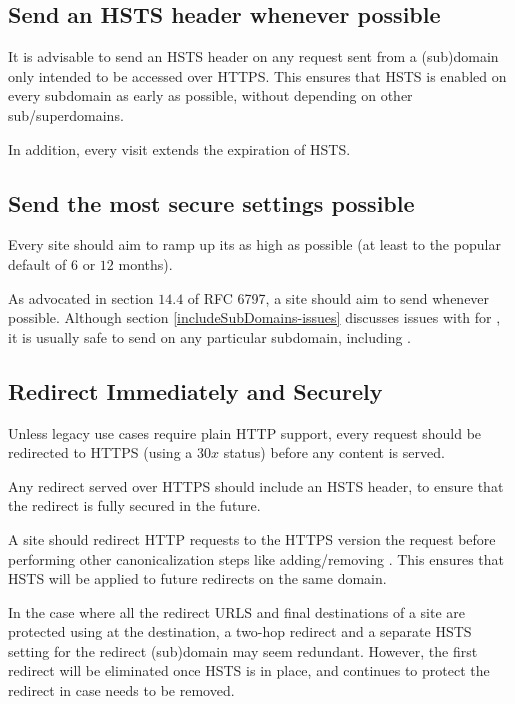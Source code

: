 \documentclass{acm_proc_article-sp}
\begin{document}
{\subsection{Send an HSTS header whenever possible}

It is advisable to send an HSTS header on any request sent from a (sub)domain only intended to be accessed over HTTPS. This ensures that HSTS is enabled on every subdomain as early as possible, without depending on other sub/superdomains.

In addition, every visit extends the expiration of HSTS.

\subsection{Send the most secure settings possible}

Every site should aim to ramp up its  as high as possible (at least to the popular default of $6$ or $12$ months).

As advocated in section $14.4$ of RFC 6797\cite{rfc}, a site should aim to send  whenever possible. Although section \ref{includeSubDomains-issues} discusses issues with {\iSD} for {\s}, it is usually safe to send {\iSD} on any particular subdomain, including {\sw}.

\subsection{Redirect Immediately and Securely}

Unless legacy use cases require plain HTTP support, every request should be redirected to HTTPS (using a $30x$ status) before any content is served.

Any redirect served over HTTPS should include an HSTS header, to ensure that the redirect is fully secured in the future.

A site should redirect HTTP requests to the HTTPS version the request before performing other canonicalization steps like adding/removing . This ensures that HSTS will be applied to future redirects on the same domain.

In the case where all the redirect URLS and final destinations of a site are protected using {\iSD} at the destination, a two-hop redirect and a separate HSTS setting for the redirect (sub)domain may seem redundant. However, the first redirect will be eliminated once HSTS is in place, and continues to protect the redirect in case {\iSD} needs to be removed.

}
\end{document}
